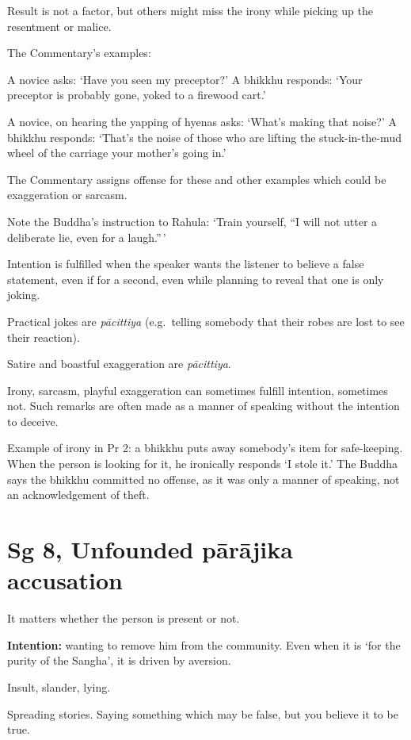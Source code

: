 Result is not a factor, but others might miss the irony while picking up
the resentment or malice.

The Commentary's examples:

A novice asks: `Have you seen my preceptor?' A bhikkhu responds: `Your
preceptor is probably gone, yoked to a firewood cart.'

A novice, on hearing the yapping of hyenas asks: `What's making that
noise?' A bhikkhu responds: `That's the noise of those who are lifting
the stuck-in-the-mud wheel of the carriage your mother's going in.'

The Commentary assigns offense for these and other examples which could
be exaggeration or sarcasm.

Note the Buddha's instruction to Rahula: `Train yourself, ``I will not
utter a deliberate lie, even for a laugh.''\,'

Intention is fulfilled when the speaker wants the listener to believe a
false statement, even if for a second, even while planning to reveal
that one is only joking.

Practical jokes are \emph{pācittiya} (e.g.~telling somebody that their
robes are lost to see their reaction).

Satire and boastful exaggeration are \emph{pācittiya}.

Irony, sarcasm, playful exaggeration can sometimes fulfill intention,
sometimes not. Such remarks are often made as a manner of speaking
without the intention to deceive.

Example of irony in Pr 2: a bhikkhu puts away somebody's item for
safe-keeping. When the person is looking for it, he ironically responds
`I stole it.' The Buddha says the bhikkhu committed no offense, as it
was only a manner of speaking, not an acknowledgement of theft.

\section{Sg 8, Unfounded pārājika accusation}

It matters whether the person is present or not.

\textbf{Intention:} wanting to remove him from the community. Even when
it is `for the purity of the Sangha', it is driven by aversion.

Insult, slander, lying.

Spreading stories. Saying something which may be false, but you believe
it to be true.

